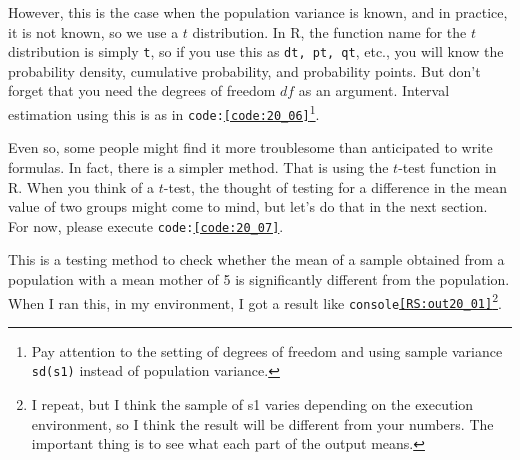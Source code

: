 \documentclass{ltjsbook}
\begin{document}
However, this is the case when the population variance is known, and in practice, it is not known, so we use a $t$ distribution. In R, the function name for the $t$ distribution is simply \texttt{t}, so if you use this as \texttt{dt, pt, qt}, etc., you will know the probability density, cumulative probability, and probability points. But don't forget that you need the degrees of freedom $df$ as an argument. Interval estimation using this is as in \texttt{code:\ref{code:20_06}}\footnote{Pay attention to the setting of degrees of freedom and using sample variance \texttt{sd(s1)} instead of population variance.}.

Even so, some people might find it more troublesome than anticipated to write formulas. In fact, there is a simpler method. That is using the $t$-test function in R. When you think of a $t$-test, the thought of testing for a difference in the mean value of two groups might come to mind, but let's do that in the next section. For now, please execute \texttt{code:\ref{code:20_07}}.

This is a testing method to check whether the mean of a sample obtained from a population with a mean mother of 5 is significantly different from the population. When I ran this, in my environment, I got a result like \texttt{console\ref{RS:out20_01}}\footnote{I repeat, but I think the sample of s1 varies depending on the execution environment, so I think the result will be different from your numbers. The important thing is to see what each part of the output means.}.
\end{document}
